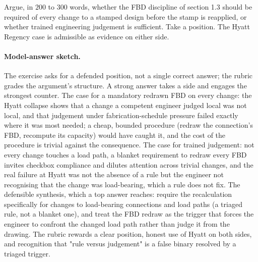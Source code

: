 \begin{exercise}
Argue, in $200$ to $300$ words, whether the FBD discipline of section
1.3 should be required of every change to a stamped design before the
stamp is reapplied, or whether trained engineering judgement is
sufficient. Take a position. The Hyatt Regency case is admissible as
evidence on either side.
\paragraph{Model-answer sketch.} The exercise asks for a defended
position, not a single correct answer; the rubric grades the argument's
structure. A strong answer takes a side and engages the strongest
counter. The case for a mandatory redrawn FBD on every change: the Hyatt
collapse shows that a change a competent engineer judged local was not
local, and that judgement under fabrication-schedule pressure failed
exactly where it was most needed; a cheap, bounded procedure (redraw the
connection's FBD, recompute its capacity) would have caught it, and the
cost of the procedure is trivial against the consequence. The case for
trained judgement: not every change touches a load path, a blanket
requirement to redraw every FBD invites checkbox compliance and dilutes
attention across trivial changes, and the real failure at Hyatt was not
the absence of a rule but the engineer not recognising that the change
was load-bearing, which a rule does not fix. The defensible synthesis,
which a top answer reaches: require the recalculation specifically for
changes to load-bearing connections and load paths (a triaged rule, not
a blanket one), and treat the FBD redraw as the trigger that forces the
engineer to confront the changed load path rather than judge it from the
drawing. The rubric rewards a clear position, honest use of Hyatt on
both sides, and recognition that "rule versus judgement" is a false
binary resolved by a triaged trigger.
\end{exercise}
